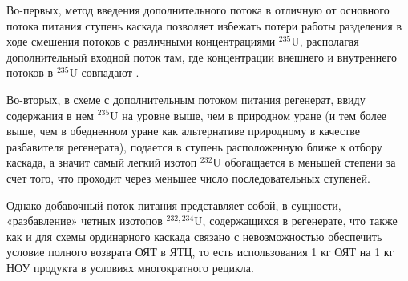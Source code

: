 Во-первых, метод введения дополнительного потока в отличную от основного потока питания ступень каскада позволяет избежать потери работы разделения в ходе смешения потоков с различными концентрациями $^{235}$U, располагая дополнительный входной поток там, где концентрации внешнего и внутреннего потоков в $^{235}$U совпадают \cite{smirnovKaskadnyeShemyZadachah2012, sulaberidzeQuasiidealCascadesAdditional2006}.

Во-вторых, в схеме с дополнительным потоком питания регенерат, ввиду содержания в нем $^{235}$U на уровне выше, чем в природном уране (и тем более выше, чем в обедненном уране как альтернативе природному в качестве разбавителя регенерата), подается в ступень расположенную ближе к отбору каскада, а значит самый легкий изотоп $^{232}$U обогащается в меньшей степени за счет того, что проходит через меньшее число последовательных ступеней.

Однако добавочный поток питания представляет собой, в сущности, «разбавление» четных изотопов  $^{232,234}$U, содержащихся в регенерате, что также как и для схемы ординарного каскада связано с невозможностью обеспечить условие полного возврата ОЯТ в ЯТЦ, то есть использования 1 кг ОЯТ на 1 кг НОУ продукта в условиях многократного рецикла. 



